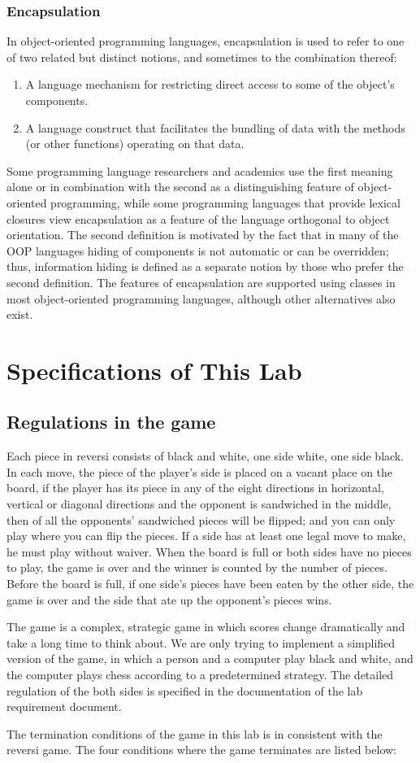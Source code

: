 \documentclass[a4paper]{report}
\begin{document}
\subsection{Encapsulation}
In object-oriented programming languages, encapsulation is used to refer to one of two related but distinct notions, and sometimes to the combination thereof: 
\begin{enumerate}
\item A language mechanism for restricting direct access to some of the object's components.
\item A language construct that facilitates the bundling of data with the methods (or other functions) operating on that data.
\end{enumerate}
Some programming language researchers and academics use the first meaning alone or in combination with the second as a distinguishing feature of object-oriented programming, while some programming languages that provide lexical closures view encapsulation as a feature of the language orthogonal to object orientation. 
The second definition is motivated by the fact that in many of the OOP languages hiding of components is not automatic or can be overridden; thus, information hiding is defined as a separate notion by those who prefer the second definition. 
The features of encapsulation are supported using classes in most object-oriented programming languages, although other alternatives also exist. 

\chapter{Specifications of This Lab}
\section{Regulations in the game}
Each piece in reversi consists of black and white, one side white, one side black. In each move, the piece of the player's side is placed on a vacant place on the board, if the player has its piece in any of the eight directions in horizontal, vertical or diagonal directions and the opponent is sandwiched in the middle, then of all the opponents' sandwiched pieces will be flipped; and you can only play where you can flip the pieces. If a side has at least one legal move to make, he must play without waiver. When the board is full or both sides have no pieces to play, the game is over and the winner is counted by the number of pieces. Before the board is full, if one side's pieces have been eaten by the other side, the game is over and the side that ate up the opponent's pieces wins. 
\par
The game is a complex, strategic game in which scores change dramatically and take a long time to think about. We are only trying to implement a simplified version of the game, in which a person and a computer play black and white, and the computer plays chess according to a predetermined strategy. The detailed regulation of the both sides is specified in the  documentation of the lab requirement document.
\par
The termination conditions of the game in this lab is in consistent with the reversi game. The four conditions where the game terminates are listed below:
\end{document}

